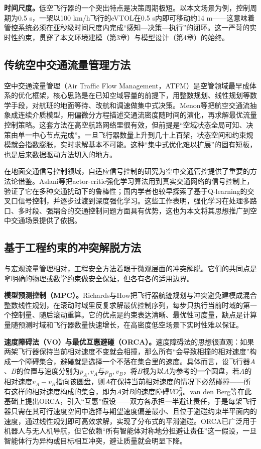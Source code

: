 \documentclass[12pt,a4paper,UTF8]{ctexart}
\begin{document}
\textbf{时间尺度。}低空飞行器的一个突出特点是决策周期极短。以本文场景为例，控制周期为0.5 s，一架以100 km/h飞行的eVTOL在0.5 s内即可移动约14 m——这意味着管控系统必须在亚秒级时间尺度内完成“感知—决策—执行”的闭环。这一严苛的实时性约束，贯穿了本文环境建模（第3章）与模型设计（第4章）的始终。

\subsection{传统空中交通流量管理方法}

空中交通流量管理（Air Traffic Flow Management，ATFM）是空管领域最早成体系的优化框架，核心思路是在已知空域容量的前提下，用整数规划、线性规划等数学手段，对航班的地面等待、改航和调速做集中式决策。Menon等\cite{ref2}把航空交通流抽象成连续介质模型，用偏微分方程描述交通流密度随时间的演化，再求解最优流量控制策略。这套方法在高空航路网络里很有效，但前提是“空域状态全局可知、决策由单一中心节点完成”。一旦飞行器数量上升到几十上百架，状态空间和约束规模就会指数膨胀，实时求解基本不可能。这种“集中式优化难以扩展”的固有短板，也是后来数据驱动方法切入的地方。

在地面交通信号控制领域，自适应信号控制的研究为空中交通管控提供了重要的方法论借鉴。Aslani等\cite{ref12}把actor-critic强化学习算法用到真实交通网络的信号控制上，验证了它在多种交通扰动下的鲁棒性；国内学者也较早探索了基于Q-learning的交叉口信号控制\cite{ref16,ref19,ref20}，并逐步过渡到深度强化学习\cite{ref15,ref17,ref18,ref22}。这些工作表明，强化学习在处理多路口、多时段、强耦合的交通控制问题方面具有优势，这也为本文将其思想推广到空中交通场景提供了依据。

\subsection{基于工程约束的冲突解脱方法}

与宏观流量管理相对，工程安全方法着眼于微观层面的冲突解脱。它们的共同点是拿明确的物理或数学约束做安全保证，但各有各的适用边界。

\textbf{模型预测控制（MPC）。}Richards与How\cite{ref3}把飞行器航迹规划与冲突避免建模成混合整数线性规划，在滚动时域里反复求解最优控制序列，每步只执行当前时域的第一个控制量、随后滚动重算。它的优点是约束表达清晰、最优性可度量，缺点是计算量随预测时域和飞行器数量快速增长，在高密度低空场景下实时性难以保证。

\textbf{速度障碍法（VO）与最优互惠避碰（ORCA）。}速度障碍法的思想很直观：如果两架飞行器保持当前相对速度不变就会相撞，那么所有“会导致相撞的相对速度”构成一个障碍集合，避碰就是选择一个不落在集合里的速度。具体而言，设飞行器$A$、$B$的位置与速度分别为$p_A,v_A$与$p_B,v_B$，将$B$视为以$A$为参考的一个圆盘，若$A$的相对速度$v_A-v_B$指向该圆盘，则$A$在保持当前相对速度的情况下必然碰撞——所有这样的相对速度构成的集合，即为$A$对$B$的速度障碍$VO^B_A$。van den Berg等\cite{ref4}在此基础上提出ORCA，引入“互惠”假设——双方各承担一半避让责任，于是每架飞行器只需在其可行速度空间中选择与期望速度偏差最小、且位于避碰约束半平面内的速度，通过线性规划即可高效求解，实现了分布式的平滑避碰。ORCA已广泛用于机器人与无人机导航，但它依赖“所有智能体对称地分担避让责任”这一假设，一旦智能体行为异构或目标相互冲突，避让质量就会明显下降。
\end{document}

